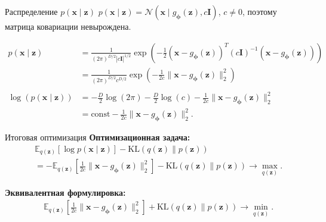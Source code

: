 \begin{frame}{Распределение $p(\boldsymbol{x} \mid \boldsymbol{z})$}
    $p(\boldsymbol{x} \mid \boldsymbol{z}) = \mathcal{N}(\boldsymbol{x} \mid g_{\boldsymbol{\phi}}(\boldsymbol{z}), c\mathbf{I})$, $c \neq 0$, поэтому матрица ковариации невырождена.

    \begin{align*}
        p(\boldsymbol{x} \mid \boldsymbol{z})
         & = \frac{1}{(2\pi)^{D/2}|c\mathbf{I}|^{1/2}}\exp\left(-\frac{1}{2}(\boldsymbol{x} - g_{\boldsymbol{\phi}}(\boldsymbol{z}))^T(c\mathbf{I})^{-1}(\boldsymbol{x} - g_{\boldsymbol{\phi}}(\boldsymbol{z}))\right) \\
         & = \frac{1}{(2\pi)^{D/2}c^{D/2}}\exp\left(-\frac{1}{2c}\|\boldsymbol{x} - g_{\boldsymbol{\phi}}(\boldsymbol{z})\|^2_2\right)                                                                                  \\
         \\
        \log(p(\boldsymbol{x} \mid \boldsymbol{z}))
         & = -\frac{D}{2}\log(2\pi) - \frac{D}{2}\log(c) - \frac{1}{2c}\|\boldsymbol{x} - g_{\boldsymbol{\phi}}(\boldsymbol{z})\|^2_2                                                                                   \\
         & = \text{const} - \frac{1}{2c}\|\boldsymbol{x} - g_{\boldsymbol{\phi}}(\boldsymbol{z})\|^2_2.
    \end{align*}
\end{frame}

\begin{frame}{Итоговая оптимизация}
    \textbf{Оптимизационная задача:}
    \begin{align*}
         & \mathbb{E}_{q(\boldsymbol{z})}\left[\log p(\boldsymbol{x} \mid \boldsymbol{z})\right] - \text{KL}(q(\boldsymbol{z}) \parallel p(\boldsymbol{z}))                                                                  \\
         & = -\mathbb{E}_{q(\boldsymbol{z})}\left[\frac{1}{2c}\|\boldsymbol{x} - g_{\boldsymbol{\phi}}(\boldsymbol{z})\|^2_2\right] - \text{KL}(q(\boldsymbol{z}) \parallel p(\boldsymbol{z})) \to \max_{q(\boldsymbol{z})}.
    \end{align*}

    \textbf{Эквивалентная формулировка:}
    \begin{align*}
         & \mathbb{E}_{q(\boldsymbol{z})}\left[\frac{1}{2c}\|\boldsymbol{x} - g_{\boldsymbol{\phi}}(\boldsymbol{z})\|^2_2\right] + \text{KL}(q(\boldsymbol{z}) \parallel p(\boldsymbol{z})) \to \min_{q(\boldsymbol{z})}.
    \end{align*}
\end{frame}

